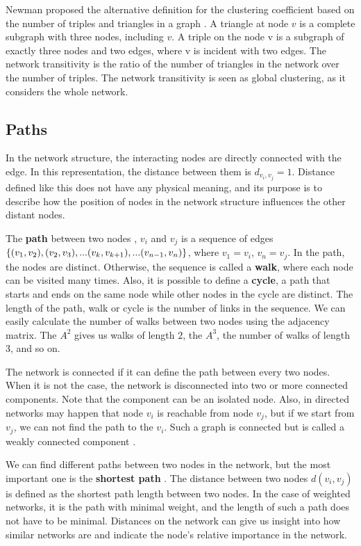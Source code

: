 Newman proposed the alternative definition for the clustering coefficient based on the number of triples and triangles in a graph \cite{newman2009random}. A triangle at node $v$ is a complete subgraph with three nodes, including $v$. A triple on the node v is a subgraph of exactly three nodes and two edges, where v is incident with two edges. The network transitivity is the ratio of the number of triangles in the network over the number of triples. The network transitivity is seen as global clustering, as it considers the whole network.  

\subsection{Paths} %
In the network structure, the interacting nodes are directly connected with the edge. In this representation, the distance between them is $d_{v_i, v_j} =1 $. Distance defined like this does not have any physical meaning, and its purpose is to describe how the position of nodes in the network structure influences the other distant nodes. 

The \textbf{path} between two nodes \cite{van2010graph}, $v_i$ and $v_j$ is a sequence of edges $\{(v_1, v_2),  (v_2, v_3), ...(v_k, v_{k+1})\\,... (v_{n-1}, v_n)\}$, where $v_1=v_i$, $v_n=v_j$. In the path, the nodes are distinct. Otherwise, the sequence is called a \textbf{walk}, where each node can be visited many times. Also, it is possible to define a \textbf{cycle}, a path that starts and ends on the same node while other nodes in the cycle are distinct. The length of the path, walk or cycle is the number of links in the sequence. We can easily calculate the number of walks between two nodes using the adjacency matrix. The $A^2$ gives us walks of length $2$, the $A^3$, the number of walks of length 3, and so on. 

The network is connected if it can define the path between every two nodes. When it is not the case, the network is disconnected into two or more connected components. Note that the component can be an isolated node. Also, in directed networks may happen that node $v_i$ is reachable from node $v_j$, but if we start from $v_j$, we can not find the path to the $v_i$. Such a graph is connected but is called a weakly connected component \cite{jackson2010social}.

We can find different paths between two nodes in the network, but the most important one is the \textbf{shortest path} \cite{van2010graph, jackson2010social}. The distance between two nodes $d(v_i, v_j)$ is defined as the shortest path length between two nodes. 
In the case of weighted networks, it is the path with minimal weight, and the length of such a path does not have to be minimal. Distances on the network can give us insight into how similar networks are and indicate the node's relative importance in the network. 

